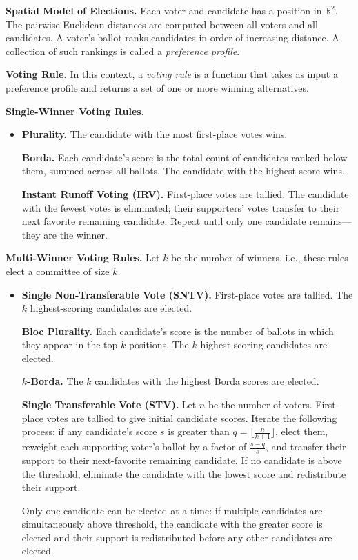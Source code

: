 \begingroup

\setlength{\parskip}{0.5em}
\setlength{\parindent}{0em}

\textbf{Spatial Model of Elections.}
Each voter and candidate has a position in $\mathbb{R}^2$.
The pairwise Euclidean distances are computed between
all voters and all candidates.
A voter's ballot ranks candidates in order of increasing distance.
A collection of such rankings is called a \textit{preference profile}.

\textbf{Voting Rule.}
In this context, a \textit{voting rule} is a function that takes as input a preference profile
and returns a set of one or more winning alternatives.

\textbf{Single-Winner Voting Rules.}

\begin{itemize}[topsep=0em]
\item[]
\textbf{Plurality.}
The candidate with the most first-place votes wins.

\textbf{Borda.}
Each candidate's score is
the total count of candidates ranked below them, summed across all ballots.
The candidate with the highest score wins.

\textbf{Instant Runoff Voting (IRV).}
First-place votes are tallied.
The candidate with the fewest votes is eliminated;
their supporters' votes transfer to their next favorite remaining candidate.
Repeat until only one candidate remains---they are the winner.

\end{itemize}

\textbf{Multi-Winner Voting Rules.} Let $k$ be the number of winners, i.e.,
these rules elect a committee of size $k$.

\begin{itemize}[topsep=0em]
  \item[]
  \textbf{Single Non-Transferable Vote (SNTV).}
  First-place votes are tallied.
  The $k$ highest-scoring candidates are elected.

  \textbf{Bloc Plurality.}
  Each candidate's score is the number of ballots in which
  they appear in the top $k$ positions.
  The $k$ highest-scoring candidates are elected.

  \textbf{$k$-Borda.}
  The $k$ candidates with the highest Borda scores are elected.

  \textbf{Single Transferable Vote (STV).}
  Let $n$ be the number of voters.
  First-place votes are tallied to give initial candidate scores.
  Iterate the following process:
  if any candidate's score $s$ is greater than
  $ q = \lfloor \frac{n}{k+1} \rfloor $, elect them,
  reweight each supporting voter's ballot by a factor of $\frac{s-q}{s}$,
  and transfer their support to their next-favorite remaining candidate.
  If no candidate is above the threshold, eliminate the candidate
  with the lowest score and redistribute their support.

  Only one candidate can be elected at a time:
  if multiple candidates are simultaneously above threshold,
  the candidate with the greater score is elected
  and their support is redistributed before any other candidates are elected.

\end{itemize}

\endgroup
